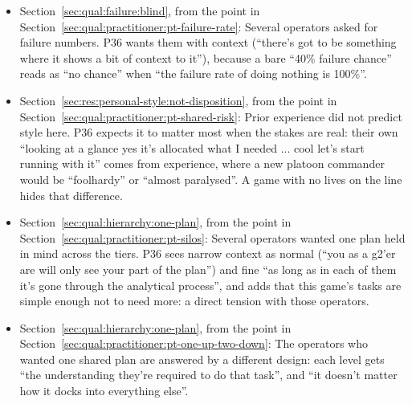 \begin{itemize}[leftmargin=1.2em,itemsep=1pt]
\item Section~\ref{sec:qual:failure:blind}, from the point in Section~\ref{sec:qual:practitioner:pt-failure-rate}: Several operators asked for failure numbers. P36 wants them with context (``there's got to be something where it shows a bit of context to it''), because a bare ``40\% failure chance'' reads as ``no chance'' when ``the failure rate of doing nothing is 100\%''.
\item Section~\ref{sec:res:personal-style:not-disposition}, from the point in Section~\ref{sec:qual:practitioner:pt-shared-risk}: Prior experience did not predict style here. P36 expects it to matter most when the stakes are real: their own ``looking at a glance yes it's allocated what I needed ... cool let's start running with it'' comes from experience, where a new platoon commander would be ``foolhardy'' or ``almost paralysed''. A game with no lives on the line hides that difference.
\item Section~\ref{sec:qual:hierarchy:one-plan}, from the point in Section~\ref{sec:qual:practitioner:pt-silos}: Several operators wanted one plan held in mind across the tiers. P36 sees narrow context as normal (``you as a g2'er are will only see your part of the plan'') and fine ``as long as in each of them it's gone through the analytical process'', and adds that this game's tasks are simple enough not to need more: a direct tension with those operators.
\item Section~\ref{sec:qual:hierarchy:one-plan}, from the point in Section~\ref{sec:qual:practitioner:pt-one-up-two-down}: The operators who wanted one shared plan are answered by a different design: each level gets ``the understanding they're required to do that task'', and ``it doesn't matter how it docks into everything else''.
\end{itemize}

